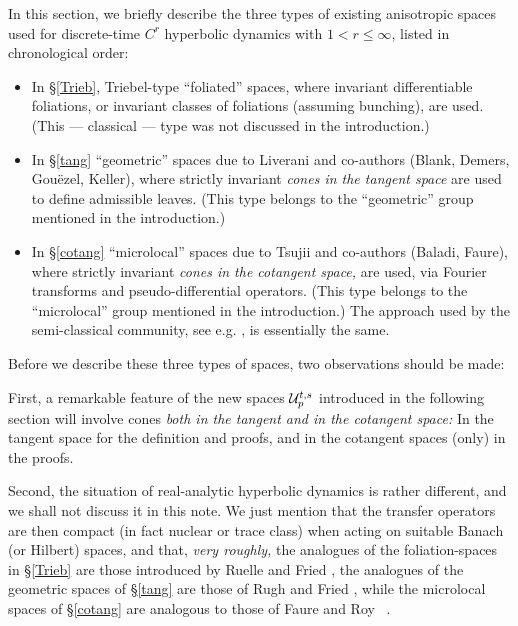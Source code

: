 \documentclass[10pt,twoside]{amsart}
\begin{document}
In  this section, we briefly describe the three types of existing
anisotropic spaces used for discrete-time $C^r$ hyperbolic dynamics with $1<r\le \infty$, listed
in chronological order:
\begin{itemize}
\item In \S\ref{Trieb},  Triebel-type ``foliated'' spaces, where  invariant differentiable
foliations, or invariant classes of foliations (assuming bunching),
are used. (This --- classical --- type was not discussed in the introduction.)
\item In \S\ref{tang}  ``geometric'' spaces due to Liverani and co-authors (Blank, Demers, Gou\"ezel, Keller), where strictly invariant
{\it  cones in the  tangent space} are used to define admissible leaves.
(This type belongs to the ``geometric'' group mentioned in the introduction.)
\item In \S\ref{cotang}  ``microlocal'' spaces due to 
Tsujii and co-authors (Baladi, Faure), where strictly invariant {\it cones
 in the  cotangent space,} are used, via Fourier transforms and pseudo-differential
operators. (This type belongs to the ``microlocal'' group mentioned in the introduction.)
The  approach 
used by the semi-classical community, see e.g. \cite{FRS}, is essentially the same.
\end{itemize}


Before we describe these three types of spaces, two observations should be made:

First, a remarkable feature of the new spaces $\mathcal{U}^{t,s}_p$ introduced in the following section will involve
cones {\it both in the tangent and in the cotangent space:} In the tangent space for
the definition  and proofs, and in the cotangent spaces (only) in the proofs.


Second, the situation of real-analytic hyperbolic dynamics is rather different, and we shall not discuss it
in this note. We just mention that the transfer operators are then compact (in fact nuclear or trace class)
when acting on suitable Banach (or Hilbert) spaces, and that, {\it very roughly,} 
the analogues of the foliation-spaces in \S\ref{Trieb}
are those introduced by Ruelle \cite{ruelle_analytique} and Fried \cite{Fr0}, the analogues of the geometric spaces of \S\ref{tang}
are those of Rugh \cite{Ru1} and Fried \cite{Fr1}, while the microlocal spaces of \S\ref{cotang} are analogous to those of
Faure and Roy ~\cite{FR}.
\end{document}
